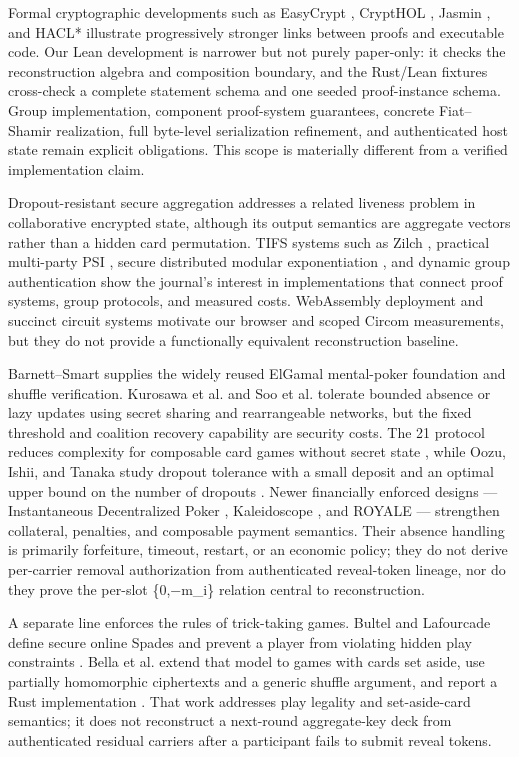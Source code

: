 \documentclass[11pt]{article}
\begin{document}
Formal cryptographic developments such as EasyCrypt \cite{ref28}, CryptHOL \cite{ref29}, Jasmin \cite{ref30}, and HACL* \cite{ref31} illustrate progressively stronger links between proofs and executable code. Our Lean development is narrower but not purely paper-only: it checks the reconstruction algebra and composition boundary, and the Rust/Lean fixtures cross-check a complete statement schema and one seeded proof-instance schema. Group implementation, component proof-system guarantees, concrete Fiat--Shamir realization, full byte-level serialization refinement, and authenticated host state remain explicit obligations. This scope is materially different from a verified implementation claim.

Dropout-resistant secure aggregation \cite{ref32,ref33} addresses a related liveness problem in collaborative encrypted state, although its output semantics are aggregate vectors rather than a hidden card permutation. TIFS systems such as Zilch \cite{ref34}, practical multi-party PSI \cite{ref35}, secure distributed modular exponentiation \cite{ref36}, and dynamic group authentication \cite{ref37} show the journal’s interest in implementations that connect proof systems, group protocols, and measured costs. WebAssembly deployment \cite{ref38} and succinct circuit systems \cite{ref39,ref40} motivate our browser and scoped Circom measurements, but they do not provide a functionally equivalent reconstruction baseline.

Barnett–Smart \cite{ref9} supplies the widely reused ElGamal mental-poker foundation and shuffle verification. Kurosawa et al. \cite{ref10} and Soo et al. \cite{ref11} tolerate bounded absence or lazy updates using secret sharing and rearrangeable networks, but the fixed threshold and coalition recovery capability are security costs. The 21 protocol reduces complexity for composable card games without secret state \cite{ref43}, while Oozu, Ishii, and Tanaka study dropout tolerance with a small deposit and an optimal upper bound on the number of dropouts \cite{ref44}. Newer financially enforced designs — Instantaneous Decentralized Poker \cite{ref12}, Kaleidoscope \cite{ref13}, and ROYALE \cite{ref14} — strengthen collateral, penalties, and composable payment semantics. Their absence handling is primarily forfeiture, timeout, restart, or an economic policy; they do not derive per-carrier removal authorization from authenticated reveal-token lineage, nor do they prove the per-slot \{0,−m\_i\} relation central to reconstruction.

A separate line enforces the rules of trick-taking games. Bultel and Lafourcade define secure online Spades and prevent a player from violating hidden play constraints \cite{ref47}. Bella et al. extend that model to games with cards set aside, use partially homomorphic ciphertexts and a generic shuffle argument, and report a Rust implementation \cite{ref48}. That work addresses play legality and set-aside-card semantics; it does not reconstruct a next-round aggregate-key deck from authenticated residual carriers after a participant fails to submit reveal tokens.
\end{document}
